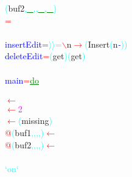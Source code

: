 \textcolor{cyan}{(}{\rm{}buf2}\textcolor{cyan}{,}\hsspace \textcolor{green}{\underline{\_}}\textcolor{cyan}{,}\textcolor{cyan}{,}\hsspace \textcolor{green}{\underline{\_}}\textcolor{cyan}{,}\hsspace \textcolor{green}{\underline{\_}}\textcolor{cyan}{)}\\\hstab \textcolor{red}{=}\\\\\textcolor{blue}{insertEdit}\hsspace \hsspace \textcolor{red}{=}\hsspace \textcolor{cyan}{\ensuremath{\rangle}\ensuremath{\rangle}=}\hsspace \textcolor{red}{$\backslash$}{\rm{}n}\hsspace \textcolor{red}{\ensuremath{\rightarrow}}\hsspace \textcolor{cyan}{(}{\rm{}Insert}\hsspace \textcolor{cyan}{(}{\rm{}n}\hsspace \textcolor{blue}{{\it{}-}}\textcolor{cyan}{)}\textcolor{cyan}{)}\\\textcolor{blue}{deleteEdit}\hsspace \textcolor{red}{=}\hsspace \textcolor{cyan}{(}{\rm{}get}\textcolor{cyan}{)}\hsspace \textcolor{cyan}{(}{\rm{}get}\textcolor{cyan}{)}\\\\\textcolor{blue}{main}\hsspace \textcolor{red}{=}\hsspace \textcolor{green}{\underline{do}}\\\\\hsspace \textcolor{red}{\ensuremath{\leftarrow}}\\\hsspace \hsspace \hsspace \textcolor{red}{\ensuremath{\leftarrow}}\hsspace \textcolor{magenta}{2}\\\hsspace \hsspace \hsspace \textcolor{red}{\ensuremath{\leftarrow}}\hsspace \textcolor{cyan}{(}{\rm{}missing}\textcolor{cyan}{)}\\\textcolor{red}{@}\textcolor{cyan}{(}{\rm{}buf1}\textcolor{cyan}{,}\textcolor{cyan}{,}\textcolor{cyan}{,}\textcolor{cyan}{,}\textcolor{cyan}{)}\hsspace \textcolor{red}{\ensuremath{\leftarrow}}\\\textcolor{red}{@}\textcolor{cyan}{(}{\rm{}buf2}\textcolor{cyan}{,}\textcolor{cyan}{,}\textcolor{cyan}{,}\textcolor{cyan}{,}\textcolor{cyan}{)}\hsspace \textcolor{red}{\ensuremath{\leftarrow}}\\\\\hsspace \textcolor{cyan}{`on`}\hsspace 